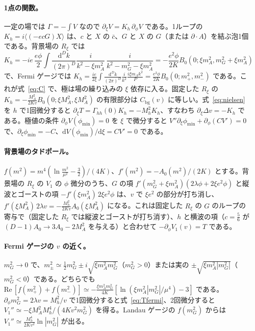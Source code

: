 \documentclass[a4paper,10pt]{ltjsarticle}
\newcommand{\dd}{\mathrm{d}}
\newcommand{\re}{\mathrm{Re}\,}
\begin{document}
\paragraph{1点の関数。}一定の場では $\Gamma=-\int V$ なので $\partial_\xi V=K_h\,\partial_\phi V$ である。1ループの $K_h=i\langle(-ecG)X\rangle$ は、$c$ と $X$ の $\bar c$、$G$ と $X$ の $G$（または $\partial\!\cdot\!A$）を結ぶ泡1個である。背景場の $R_\xi$ では
\begin{equation*}
K_h=-ie\,\frac{e\phi}2\int\frac{\dd^Dk}{(2\pi)^D}\frac{i}{k^2-\xi m_A^2}\,\frac{i}{k^2-m_G^2-\xi m_A^2}=-\frac{e^2\phi}{2K}B_0(0;\xi m_A^2,m_G^2+\xi m_A^2)
\end{equation*}
で、Fermi ゲージでは $K_h=\frac{ie}{2\xi}\int\frac{\dd^Dk}{(2\pi)^D}\frac{i}{k^2}\frac{i\xi m_Ak^2}P=\frac{e^2\phi}{2K}B_0(0;m_+^2,m_-^2)$ である。これが式~\eqref{eq:C} で、極は場の繰り込みの $\xi$ 依存に入る。固定した $R_\xi$ の $K_h=-\frac{M_A^2}{2Kv}B_0(0;\xi M_A^2,\xi M_A^2)$ の有限部分は $C_{\mathrm{bg}}(v)$ に等しい。式~\eqref{eq:nielsen} を $h$ で1回微分すると $\partial_\xi T=\Gamma_{hh}(0)K_h=-M_h^2K_h$、すなわち $\partial_\xi\Delta v=-K_h$ である。極値の条件 $\partial_\phi V(\phi_{\min})=0$ を $\xi$ で微分すると $V''\partial_\xi\phi_{\min}+\partial_\phi(CV')=0$ で、$\partial_\xi\phi_{\min}=-C$、$\dd V(\phi_{\min})/\dd\xi=CV'=0$ である。

\paragraph{背景場のタドポール。}$f(m^2)=m^4(\ln\frac{m^2}{\mu^2}-\frac32)/(4K)$、$f'(m^2)=-A_0(m^2)/(2K)$ とする。背景場の $R_\xi$ の $V_1$ の $\phi$ 微分のうち、$G$ の項 $f'(m_G^2+\xi m_A^2)(2\lambda\phi+2\xi e^2\phi)$ と縦波とゴーストの項 $-f'(\xi m_A^2)\,2\xi e^2\phi$ は、$v$ で $\xi e^2$ の部分が打ち消し、$f'(\xi M_A^2)\,2\lambda v=-\frac{M_h^2}{2Kv}A_0(\xi M_A^2)$ になる。これは固定した $R_\xi$ の $G$ のループの寄与で（固定した $R_\xi$ では縦波とゴーストが打ち消す）、$h$ と横波の項（$c=\frac56$ が $(D-1)A_0\to3A_0-2M_A^2$ を与える）と合わせて $-\partial_\phi V_1(v)=T$ である。

\paragraph{Fermi ゲージの $v$ の近く。}$m_G^2\to0$ で、$m_\pm^2\simeq\frac12m_G^2\pm i\sqrt{\xi m_A^2m_G^2}$（$m_G^2>0$）または実の $\pm\sqrt{\xi m_A^2|m_G^2|}$（$m_G^2<0$）である。どちらでも $\re[f(m_+^2)+f(m_-^2)]\simeq-\frac{\xi m_A^2m_G^2}{4K}[\ln(\xi m_A^2|m_G^2|/\mu^4)-3]$ である。$\partial_\phi m_G^2=2\lambda v=M_h^2/v$ で1回微分すると式~\eqref{eq:Tfermi}、2回微分すると $V_1''\simeq-\xi M_A^2M_h^4/(4Kv^2m_G^2)$ を得る。Landau ゲージの $f(m_G^2)$ からは $V_1''\simeq\frac{M_h^4}{2Kv^2}\ln|m_G^2|$ が出る。
\end{document}
